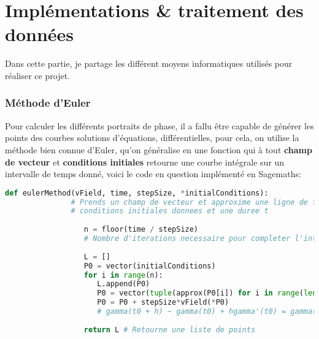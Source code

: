 \chapter{Implémentations \& traitement des données}
Dans cette partie, je partage les différent moyens informatiques utilisés pour réaliser ce projet.
   \subsection{Méthode d'Euler}
      Pour calculer les différents portraits de phase, il a fallu être capable de générer les points des courbes solutions d'équations, différentielles, pour cela, on utilise la méthode bien connue d'Euler, qu'on généralise en une fonction qui à tout \textbf{champ de vecteur} et \textbf{conditions initiales} retourne une courbe intégrale sur un intervalle de temps donné, voici le code en question implémenté en Sagemaths:
      \begin{center}
         \begin{lstlisting}[language=Python, caption=Méthode d'Euler générale]
               def eulerMethod(vField, time, stepSize, *initialConditions): 
               # Prends un champ de vecteur et approxime une ligne de flot pour des
               # conditions initiales donnees et une duree t
               
                  n = floor(time / stepSize)     
                  # Nombre d'iterations necessaire pour completer l'intervalle de temps
               
                  L = []
                  P0 = vector(initialConditions)
                  for i in range(n):
                     L.append(P0)
                     P0 = vector(tuple(approx(P0[i]) for i in range(len(initialConditions))))  
                     P0 = P0 + stepSize*vField(*P0) 
                     # gamma(t0 + h) ~ gamma(t0) + hgamma'(t0) = gamma(t0) + hF(gamma(t0))
                  
                  return L # Retourne une liste de points
            \end{lstlisting}
      \end{center}
   \pagebreak
